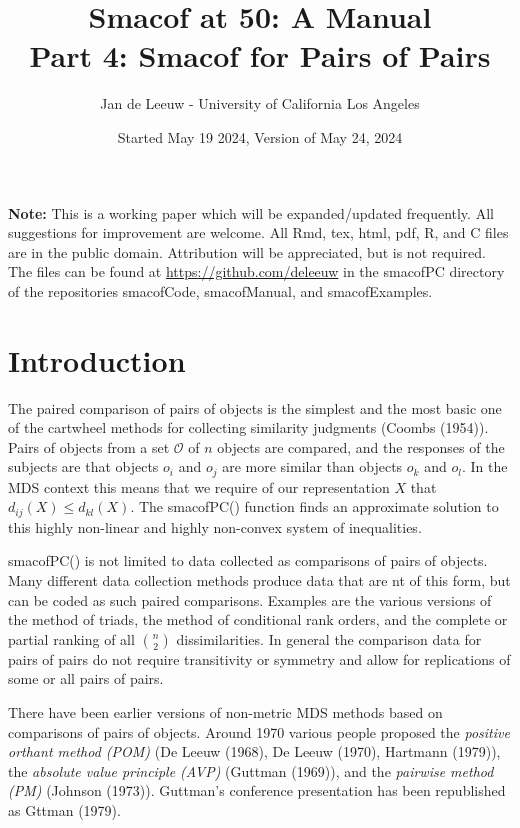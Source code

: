 \documentclass[
  12pt,
]{article}
\title{Smacof at 50: A Manual\\
Part 4: Smacof for Pairs of Pairs}
\author{Jan de Leeuw - University of California Los Angeles}
\date{Started May 19 2024, Version of May 24, 2024}
\newcommand{\sectionbreak}{\clearpage}
\begin{document}
\maketitle

{
\setcounter{tocdepth}{3}
\tableofcontents
}
\textbf{Note:} This is a working paper which will be expanded/updated
frequently. All suggestions for improvement are welcome. All Rmd, tex,
html, pdf, R, and C files are in the public domain. Attribution will be
appreciated, but is not required. The files can be found at
\url{https://github.com/deleeuw} in the smacofPC directory of the
repositories smacofCode, smacofManual, and smacofExamples.

\sectionbreak

\section{Introduction}\label{introduction}

The paired comparison of pairs of objects is the simplest and
the most basic one of the cartwheel methods for collecting
similarity judgments (Coombs (1954)). Pairs of objects from a set
\(\mathcal{O}\) of \(n\) objects are compared, and the responses of the subjects are
that objects \(o_i\) and \(o_j\) are more similar than objects
\(o_k\) and \(o_l\). In the MDS context this means that we require
of our representation \(X\) that \(d_{ij}(X)\leq d_{kl}(X)\). The smacofPC()
function finds an approximate solution to this highly non-linear and
highly non-convex system of inequalities.

smacofPC() is not limited to data collected as comparisons of
pairs of objects. Many different data collection methods produce data that are nt of this form, but can be
coded as such paired comparisons. Examples are the various versions of the
method of triads, the method of conditional rank orders, and the
complete or partial ranking of all \(\binom{n}{2}\) dissimilarities.
In general the comparison data for pairs of pairs do not require transitivity
or symmetry and allow for replications of some or all pairs of
pairs.

There have been earlier versions of non-metric MDS methods based
on comparisons of pairs of objects. Around 1970 various people proposed the \emph{positive orthant method (POM)} (De Leeuw (1968), De Leeuw (1970), Hartmann (1979)), the \emph{absolute value principle (AVP)} (Guttman (1969)), and the
\emph{pairwise method (PM)} (Johnson (1973)). Guttman's conference
presentation has been republished as Gttman (1979).
\end{document}
